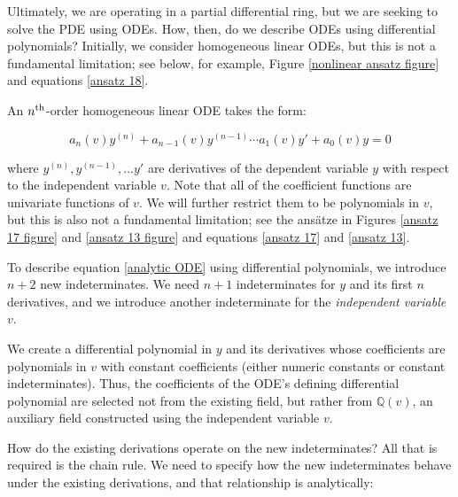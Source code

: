 \documentclass{article}
\theoremstyle{definition}
\theoremstyle{plain}
\begin{document}
Ultimately, we are operating in a partial differential ring, but we are
seeking to solve the PDE using ODEs.  How, then, do we describe ODEs using differential polynomials?
Initially, we consider homogeneous linear ODEs, but this is not a fundamental limitation;
see below, for example, Figure \ref{nonlinear ansatz figure} and equations \eqref{ansatz 18}.

An $n^{\rm th}$-order homogeneous linear ODE takes the form:

\begin{equation}
\label{analytic ODE}
a_n(v) y^{(n)} + a_{n-1}(v) y^{(n-1)} \cdots a_1(v) y' + a_0(v) y = 0
\end{equation}

where $y^{(n)}, y^{(n-1)}, ... y'$ are derivatives of the dependent variable $y$ with respect to the independent variable $v$.
Note that all of the coefficient functions are univariate functions of $v$.  We will further
restrict them to be polynomials in $v$, but this is also not a fundamental limitation;
see the ans\"atze in Figures \ref{ansatz 17 figure} and \ref{ansatz 13 figure} and equations \eqref{ansatz 17} and \eqref{ansatz 13}.


To describe equation \eqref{analytic ODE} using differential polynomials, we introduce $n+2$ new indeterminates.
We need $n+1$ indeterminates for $y$ and its first $n$ derivatives, and we
introduce another indeterminate for the {\it independent variable} $v$.

We create a differential polynomial in $y$ and its derivatives
whose coefficients are polynomials in $v$ with constant coefficients (either numeric constants or constant indeterminates).
Thus, the coefficients of the ODE's defining differential polynomial are
selected not from the existing field, but rather from ${\mathbb Q}(v)$, an auxiliary field
constructed using the independent variable $v$.

How do the existing derivations operate on the new indeterminates?
All that is required is the chain rule.  We need to specify how the new indeterminates behave under the existing
derivations, and that relationship is analytically:
\end{document}
